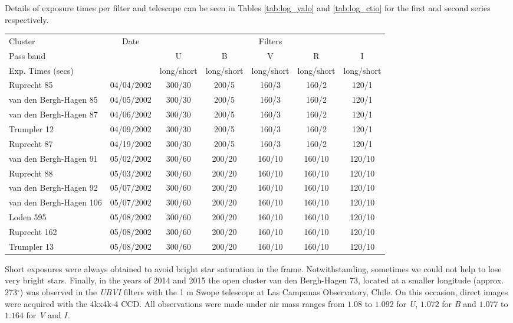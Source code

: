 \documentclass{aa}
\begin{document}
Details of exposure times per filter and telescope can be seen in Tables
\ref{tab:log_yalo} and \ref{tab:log_ctio} for the first and second series respectively.\\


\begin{table*}[ht]
    \centering
    \begin{tabular}{lcccccc}
    \hline 
        Cluster & Date &  &  & Filters &  & \\
        Pass band &  & U & B & V & R & I\\
        Exp. Times (secs) &  & long/short & long/short & long/short & long/short & long/short\\
       \hline \hline 
        Ruprecht 85 & 04/04/2002 & 300/30 & 200/5 & 160/3 & 160/2 & 120/1\\
        van den Bergh-Hagen 85 & 04/05/2002 & 300/30 & 200/5 & 160/3 & 160/2 & 120/1\\
        van den Bergh-Hagen 87 & 04/06/2002 & 300/30 & 200/5 & 160/3 & 160/2 & 120/1\\
        Trumpler 12 & 04/09/2002 & 300/30 & 200/5 & 160/3 & 160/2 & 120/1\\
        Ruprecht 87 & 04/19/2002 & 300/30 & 200/5 & 160/3 & 160/2 & 120/1\\
        van den Bergh-Hagen 91 & 05/02/2002 & 300/60 & 200/20 & 160/10 & 160/10 & 120/10\\
        Ruprecht 88 & 05/03/2002 & 300/60 & 200/20 & 160/10 & 160/10 & 120/10\\
        van den Bergh-Hagen 92 & 05/07/2002 & 300/60 & 200/20 & 160/10 & 160/10 & 120/10\\
        van den Bergh-Hagen 106 & 05/07/2002 & 300/60 & 200/20 & 160/10 & 160/10 & 120/10\\
        Loden 595 & 05/08/2002 & 300/60 & 200/20 & 160/10 & 160/10 & 120/10\\
        Ruprecht 162 & 05/08/2002 & 300/60 & 200/20 & 160/10 & 160/10 & 120/10\\
        Trumpler 13 & 05/08/2002 & 300/60 & 200/20 & 160/10 & 160/10 & 120/10\\
        \hline
    \end{tabular}
    \caption{Log of observations at YALO.}
    \label{tab:log_yalo}
\end{table*}

Short exposures were always obtained to avoid bright star saturation in the
frame. Notwithstanding, sometimes we could not help to lose very bright stars.
Finally, in the years of 2014 and 2015 the open cluster van den Bergh-Hagen 73,
located at a smaller longitude (approx. 273$^\circ$) was observed in the 
\textit{UBVI} filters with the 1 m Swope telescope at Las Campanas Observatory,
Chile. On this occasion, direct images were acquired with the 4kx4k-4 CCD. All
observations were made under air mass ranges from $1.08$ to $1.092$ for 
\textit{U}, $1.072$ for \textit{B} and $1.077$ to $1.164$ for \textit{V} and 
\textit{I}.
\end{document}
